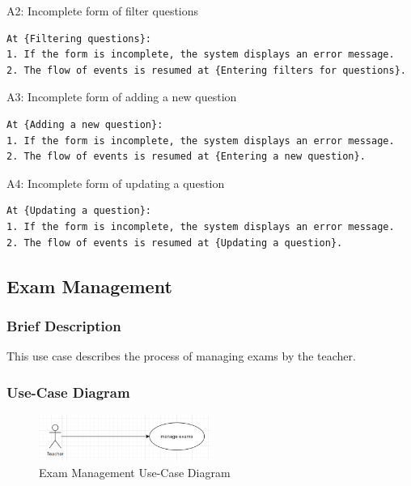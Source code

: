 \documentclass{article}
\begin{document}
\noindent A2: Incomplete form of filter questions
\begin{verbatim}
At {Filtering questions}:
1. If the form is incomplete, the system displays an error message.
2. The flow of events is resumed at {Entering filters for questions}.
\end{verbatim}

\noindent A3: Incomplete form of adding a new question
\begin{verbatim}
At {Adding a new question}:
1. If the form is incomplete, the system displays an error message.
2. The flow of events is resumed at {Entering a new question}.
\end{verbatim}

\noindent A4: Incomplete form of updating a question
\begin{verbatim}
At {Updating a question}:
1. If the form is incomplete, the system displays an error message.
2. The flow of events is resumed at {Updating a question}.
\end{verbatim}

\subsection{Exam Management}
\subsubsection{Brief Description}
This use case describes the process of managing exams by the teacher.
\subsubsection{Use-Case Diagram}
\begin{figure}[h]
    \centering
    \includegraphics[width=0.5\textwidth]{manage_exams.png}
    \caption{Exam Management Use-Case Diagram}
\end{figure}
\newpage


\end{document}
